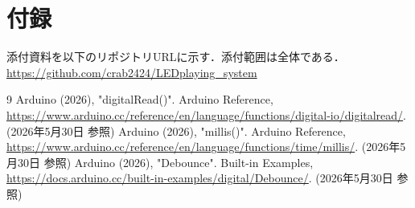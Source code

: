 \documentclass[lualatex,paper=a4paper,jafontsize=11.5pt,jafontscale=1.05]{jlreq}
\begin{document}
\section{付録}
添付資料を以下のリポジトリURLに示す．添付範囲は全体である．\\
\url{https://github.com/crab2424/LEDplaying_system}



\begin{thebibliography}{9}
 Arduino (2026), "digitalRead()". Arduino Reference, \url{https://www.arduino.cc/reference/en/language/functions/digital-io/digitalread/}. (2026年5月30日 参照)
 Arduino (2026), "millis()". Arduino Reference, \url{https://www.arduino.cc/reference/en/language/functions/time/millis/}. (2026年5月30日 参照)
 Arduino (2026), "Debounce". Built-in Examples, \url{https://docs.arduino.cc/built-in-examples/digital/Debounce/}. (2026年5月30日 参照)
\end{thebibliography}
\end{document}
